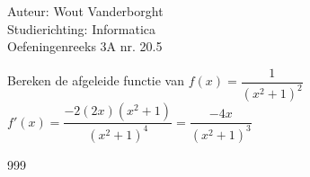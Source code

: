 \documentclass[a4paper]{article}
\begin{document}
  
\noindent \large Auteur: Wout Vanderborght\\
\noindent \large Studierichting: Informatica\\
\noindent \large Oefeningenreeks 3A nr. 20.5\\

\medskip

\normalsize

Bereken de afgeleide functie van $ f(x) = \dfrac{1}{(x^2+1)^2} $ \\

$ f'(x) = \dfrac{-2\left(2x\right)\left(x^2+1\right)}{\left(x^2+1\right)^4} = \dfrac{-4x}{\left(x^2+1\right)^3} $ \\

\begin{thebibliography}{999}
\end{thebibliography}
\end{document}

